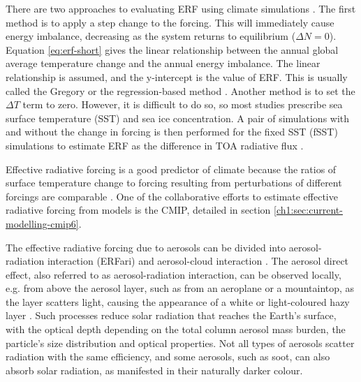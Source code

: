 There are two approaches to evaluating ERF using climate simulations \citep[e.g.][]{gregoryNewMethodDiagnosing2004, oconnorAssessmentPreindustrialPresentday2021}.  The first method is to apply a step change to the forcing. This will immediately cause energy imbalance, decreasing as the system returns to equilibrium ($\Delta N=0$). Equation \ref{eq:erf-short} gives the linear relationship between the annual global average temperature change and the annual energy imbalance. The linear relationship is assumed, and the y-intercept is the value of ERF. This is usually called the Gregory or the regression-based method \citep{gregoryNewMethodDiagnosing2004}. Another method is to set the $\Delta T$ term to zero. However, it is difficult to do so, so most studies prescribe sea surface temperature (SST) and sea ice concentration. A pair of simulations with and without the change in forcing is then performed for the fixed SST (fSST) simulations to estimate ERF as the difference in TOA radiative flux \citep{myhreNewEstimatesRadiative1998}. 


Effective radiative forcing is a good predictor of climate because the ratios of surface temperature change to forcing resulting from perturbations of different forcings are comparable \citep{myhreAnthropogenicNaturalRadiative2013, boucherCloudsAerosols2014}. One of the collaborative efforts to estimate effective radiative forcing from models is the CMIP, detailed in section \ref{ch1:sec:current-modelling-cmip6}.

The effective radiative forcing due to aerosols can be divided into aerosol-radiation interaction (ERFari) and aerosol-cloud interaction \citep[ERFaci;][]{ghanTechnicalNoteEstimating2013}. The aerosol direct effect, also referred to as aerosol-radiation interaction, can be observed locally, e.g. from above the aerosol layer, such as from an aeroplane or a mountaintop, as the layer scatters light, causing the appearance of a white or light-coloured hazy layer \citep{twomeyInfluencePollutionShortwave1977}. Such processes reduce solar radiation that reaches the Earth’s surface, with the optical depth depending on the total column aerosol mass burden, the particle's size distribution and optical properties. Not all types of aerosols scatter radiation with the same efficiency, and some aerosols, such as soot, can also absorb solar radiation, as manifested in their naturally darker colour. 

